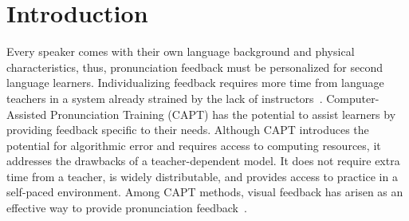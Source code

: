 \section{Introduction}


Every speaker comes with their own language background and physical characteristics, thus, pronunciation feedback must be personalized for second language learners. Individualizing feedback requires more time from language teachers in a system already strained by the lack of instructors~\cite{moser2024covid,hismanoglu2010language,rao2019key,munro2015setting}. Computer-Assisted Pronunciation Training (CAPT) has the potential to assist learners by providing feedback specific to their needs. Although CAPT introduces the potential for algorithmic error and requires access to computing resources, it addresses the drawbacks of a teacher-dependent model. It does not require extra time from a teacher, is widely distributable, and provides access to practice in a self-paced environment. Among CAPT methods, visual feedback has arisen as an effective way to provide pronunciation feedback~\cite{carey_call_2004,hew_effect_2004,offerman_visual_2016,yuen_enunciate_2011}.   

